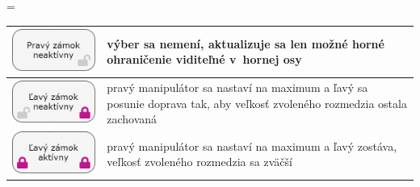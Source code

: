 \documentclass[
  digital, %
  twoside, %
  notable,   %
  nolof,   %
  nolot,   %
]{fithesis3}
\begin{document}
\begin{center}
\tabulinesep=\tabcolsep
  \begin{tabu}{ X[2,c,m] | X[7,c,m] }
    \includegraphics[width=1\linewidth]{right_unlock} & výber sa nemení, aktualizuje sa len možné horné ohraničenie viditeľné v~hornej osy \\ \hline
    \includegraphics[width=1\linewidth]{left_unlock} & pravý manipulátor sa nastaví na maximum a ľavý sa posunie doprava tak, aby veľkosť zvoleného rozmedzia ostala zachovaná \\ \hline
    \includegraphics[width=1\linewidth]{left_lock} & pravý manipulátor sa nastaví na maximum a ľavý zostáva, veľkosť zvoleného rozmedzia sa zväčší \ \
  \end{tabu}
\end{center}
\end{document}
